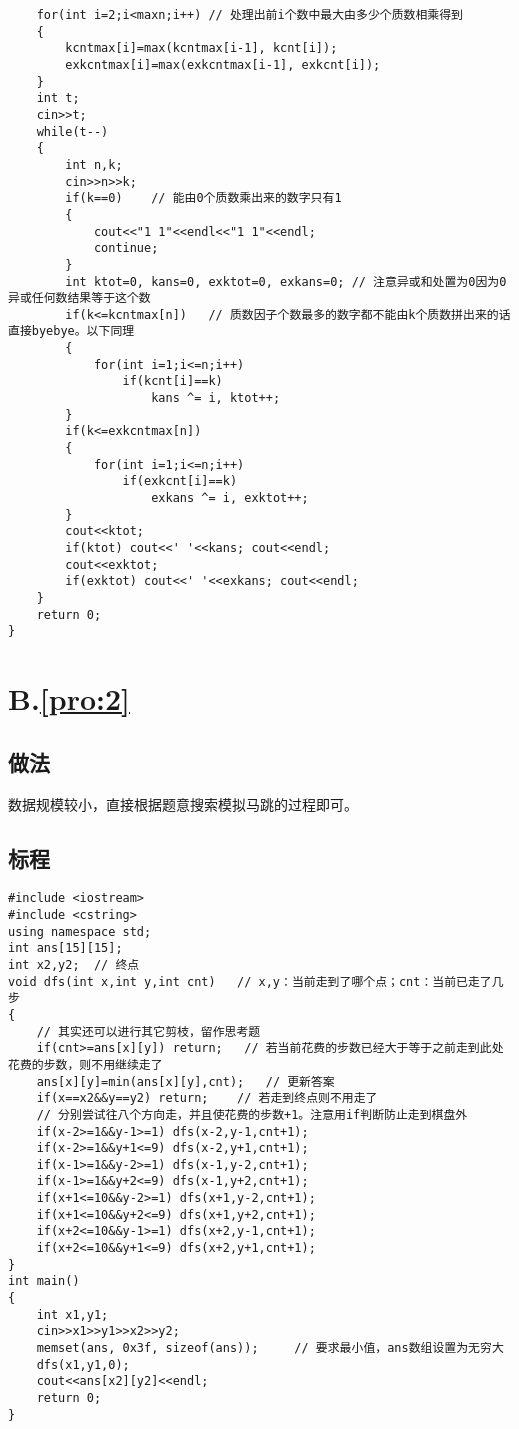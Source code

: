\documentclass[
	lang=cn,
	color=blue
]{elegantbook}
\begin{document}
\begin{lstlisting}
    for(int i=2;i<maxn;i++) // 处理出前i个数中最大由多少个质数相乘得到
    {
        kcntmax[i]=max(kcntmax[i-1], kcnt[i]);
        exkcntmax[i]=max(exkcntmax[i-1], exkcnt[i]);
    }
    int t;
    cin>>t;
    while(t--)
    {
        int n,k;
        cin>>n>>k;
        if(k==0)    // 能由0个质数乘出来的数字只有1
        {
            cout<<"1 1"<<endl<<"1 1"<<endl;
            continue;
        }
        int ktot=0, kans=0, exktot=0, exkans=0; // 注意异或和处置为0因为0异或任何数结果等于这个数
        if(k<=kcntmax[n])   // 质数因子个数最多的数字都不能由k个质数拼出来的话直接byebye。以下同理
        {
            for(int i=1;i<=n;i++)
                if(kcnt[i]==k)
                    kans ^= i, ktot++;
        }
        if(k<=exkcntmax[n])
        {
            for(int i=1;i<=n;i++)
                if(exkcnt[i]==k)
                    exkans ^= i, exktot++;
        }
        cout<<ktot;
        if(ktot) cout<<' '<<kans; cout<<endl;
        cout<<exktot;
        if(exktot) cout<<' '<<exkans; cout<<endl;
    }
    return 0;
}
\end{lstlisting}

\chapter*{B.\quad \ref*{pro:2}}
\section*{做法}
数据规模较小，直接根据题意搜索模拟马跳的过程即可。

\section*{标程}
\begin{lstlisting}
#include <iostream>
#include <cstring>
using namespace std;
int ans[15][15];
int x2,y2;  // 终点
void dfs(int x,int y,int cnt)   // x,y：当前走到了哪个点；cnt：当前已走了几步
{
    // 其实还可以进行其它剪枝，留作思考题
    if(cnt>=ans[x][y]) return;   // 若当前花费的步数已经大于等于之前走到此处花费的步数，则不用继续走了
    ans[x][y]=min(ans[x][y],cnt);   // 更新答案
    if(x==x2&&y==y2) return;    // 若走到终点则不用走了
    // 分别尝试往八个方向走，并且使花费的步数+1。注意用if判断防止走到棋盘外
    if(x-2>=1&&y-1>=1) dfs(x-2,y-1,cnt+1);
    if(x-2>=1&&y+1<=9) dfs(x-2,y+1,cnt+1);
    if(x-1>=1&&y-2>=1) dfs(x-1,y-2,cnt+1);
    if(x-1>=1&&y+2<=9) dfs(x-1,y+2,cnt+1);
    if(x+1<=10&&y-2>=1) dfs(x+1,y-2,cnt+1);
    if(x+1<=10&&y+2<=9) dfs(x+1,y+2,cnt+1);
    if(x+2<=10&&y-1>=1) dfs(x+2,y-1,cnt+1);
    if(x+2<=10&&y+1<=9) dfs(x+2,y+1,cnt+1);
}
int main()
{
    int x1,y1;
    cin>>x1>>y1>>x2>>y2;
    memset(ans, 0x3f, sizeof(ans));     // 要求最小值，ans数组设置为无穷大
    dfs(x1,y1,0);
    cout<<ans[x2][y2]<<endl;
    return 0;
}
\end{lstlisting}
\end{document}
